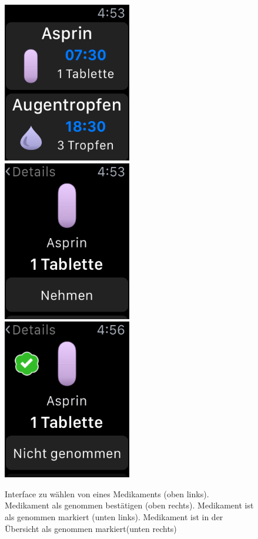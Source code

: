 \begin{figure}
	\caption{Interface zu wählen von eines Medikaments (oben links). Medikament als genommen bestätigen (oben rechts). Medikament ist als genommen markiert (unten links). Medikament ist in der Übersicht als genommen markiert(unten rechts)}
	\label{fig:watch-app-take}
	\includegraphics[width=0.5\textwidth]{04_realisation/screenshots/watch/notTaken01.png}
	\includegraphics[width=0.5\textwidth]{04_realisation/screenshots/watch/notTaken02.png}
	\includegraphics[width=0.5\textwidth]{04_realisation/screenshots/watch/taken01.png}

\end{figure}
